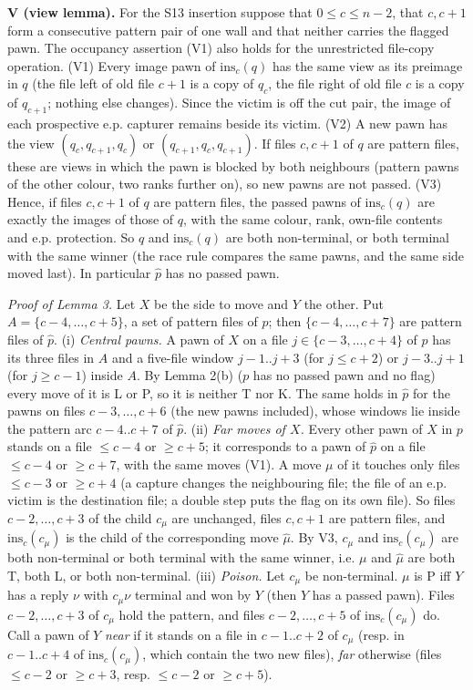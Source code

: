\textbf{V (view lemma).} For the S13 insertion suppose that $0\le c\le n-2$, that $c,c+1$ form a consecutive pattern pair of one wall and that neither carries the flagged pawn. The occupancy assertion (V1) also holds for the unrestricted file-copy operation. (V1) Every image pawn of $\mathrm{ins}_c(q)$ has the same view as its preimage in $q$ (the file left of old file $c+1$ is a copy of $q_c$, the file right of old file $c$ is a copy of $q_{c+1}$; nothing else changes). Since the victim is off the cut pair, the image of each prospective e.p. capturer remains beside its victim. (V2) A new pawn has the view $(q_c,q_{c+1},q_c)$ or $(q_{c+1},q_c,q_{c+1})$. If files $c,c+1$ of $q$ are pattern files, these are views in which the pawn is blocked by both neighbours (pattern pawns of the other colour, two ranks further on), so new pawns are not passed. (V3) Hence, if files $c,c+1$ of $q$ are pattern files, the passed pawns of $\mathrm{ins}_c(q)$ are exactly the images of those of $q$, with the same colour, rank, own-file contents and e.p. protection. So $q$ and $\mathrm{ins}_c(q)$ are both non-terminal, or both terminal with the same winner (the race rule compares the same pawns, and the same side moved last). In particular $\hat p$ has no passed pawn.

\emph{Proof of Lemma 3.} Let $X$ be the side to move and $Y$ the other. Put $A=\{c-4,\dots,c+5\}$, a set of pattern files of $p$; then $\{c-4,\dots,c+7\}$ are pattern files of $\hat p$. (i) \emph{Central pawns.} A pawn of $X$ on a file $j\in\{c-3,\dots,c+4\}$ of $p$ has its three files in $A$ and a five-file window $j-1..j+3$ (for $j\le c+2$) or $j-3..j+1$ (for $j\ge c-1$) inside $A$. By Lemma 2(b) ($p$ has no passed pawn and no flag) every move of it is L or P, so it is neither T nor K. The same holds in $\hat p$ for the pawns on files $c-3,\dots,c+6$ (the new pawns included), whose windows lie inside the pattern arc $c-4..c+7$ of $\hat p$. (ii) \emph{Far moves of $X$.} Every other pawn of $X$ in $p$ stands on a file $\le c-4$ or $\ge c+5$; it corresponds to a pawn of $\hat p$ on a file $\le c-4$ or $\ge c+7$, with the same moves (V1). A move $\mu$ of it touches only files $\le c-3$ or $\ge c+4$ (a capture changes the neighbouring file; the file of an e.p. victim is the destination file; a double step puts the flag on its own file). So files $c-2,\dots,c+3$ of the child $c_\mu$ are unchanged, files $c,c+1$ are pattern files, and $\mathrm{ins}_c(c_\mu)$ is the child of the corresponding move $\hat\mu$. By V3, $c_\mu$ and $\mathrm{ins}_c(c_\mu)$ are both non-terminal or both terminal with the same winner, i.e. $\mu$ and $\hat\mu$ are both T, both L, or both non-terminal. (iii) \emph{Poison.} Let $c_\mu$ be non-terminal. $\mu$ is P iff $Y$ has a reply $\nu$ with $c_\mu\nu$ terminal and won by $Y$ (then $Y$ has a passed pawn). Files $c-2,\dots,c+3$ of $c_\mu$ hold the pattern, and files $c-2,\dots,c+5$ of $\mathrm{ins}_c(c_\mu)$ do. Call a pawn of $Y$ \emph{near} if it stands on a file in $c-1..c+2$ of $c_\mu$ (resp. in $c-1..c+4$ of $\mathrm{ins}_c(c_\mu)$, which contain the two new files), \emph{far} otherwise (files $\le c-2$ or $\ge c+3$, resp. $\le c-2$ or $\ge c+5$).

